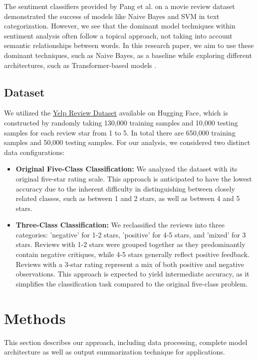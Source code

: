 \documentclass[11pt]{article}
\begin{document}
The sentiment classifiers provided by Pang et al. \citep{pang2008sentiment} on a movie review dataset demonstrated the success of models like Naive Bayes and SVM in text categorization. However, we see that the dominant model techniques within sentiment analysis often follow a topical approach, not taking into account semantic relationships between words. In this research paper, we aim to use these dominant techniques, such as Naive Bayes, as a baseline while exploring different architectures, such as Transformer-based models \citep{kokab2022transformer}.

\subsection{Dataset}
We utilized the \href{https://huggingface.co/datasets/Yelp/yelp_review_full}{Yelp Review Dataset} available on Hugging Face, which is constructed by randomly taking 130,000 training samples and 10,000 testing samples for each review star from 1 to 5. In total there are 650,000 training samples and 50,000 testing samples. For our analysis, we considered two distinct data configurations:

\begin{itemize}
  \item \textbf{Original Five-Class Classification:} We analyzed the dataset with its original five-star rating scale. This approach is anticipated to have the lowest accuracy due to the inherent difficulty in distinguishing between closely related classes, such as between 1 and 2 stars, as well as between 4 and 5 stars.

  \item \textbf{Three-Class Classification:} We reclassified the reviews into three categories: 'negative' for 1-2 stars, 'positive' for 4-5 stars, and 'mixed' for 3 stars. Reviews with 1-2 stars were grouped together as they predominantly contain negative critiques, while 4-5 stars generally reflect positive feedback. Reviews with a 3-star rating represent a mix of both positive and negative observations. This approach is expected to yield intermediate accuracy, as it simplifies the classification task compared to the original five-class problem.
\end{itemize}

\section{Methods}
This section describes our approach, including data processing, complete model architecture as well as output summarization technique for applications.
\end{document}
